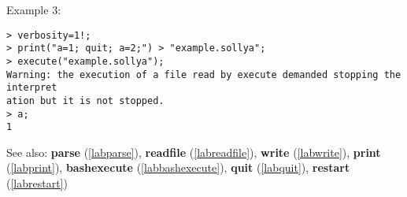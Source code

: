 \noindent Example 3: 
\begin{center}\begin{minipage}{15cm}\begin{Verbatim}[frame=single]
> verbosity=1!;
> print("a=1; quit; a=2;") > "example.sollya";
> execute("example.sollya"); 
Warning: the execution of a file read by execute demanded stopping the interpret
ation but it is not stopped.
> a;
1
\end{Verbatim}
\end{minipage}\end{center}
See also: \textbf{parse} (\ref{labparse}), \textbf{readfile} (\ref{labreadfile}), \textbf{write} (\ref{labwrite}), \textbf{print} (\ref{labprint}), \textbf{bashexecute} (\ref{labbashexecute}), \textbf{quit} (\ref{labquit}), \textbf{restart} (\ref{labrestart})
